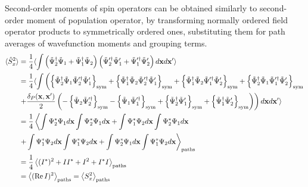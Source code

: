 Second-order moments of spin operators can be obtained similarly to second-order moment of population operator, by transforming normally ordered field operator products to symmetrically ordered ones, substituting them for path averages of wavefunction moments and grouping terms.
\begin{equation*}
\begin{split}
	\langle \hat{S}^2_x \rangle
	& = \frac{1}{4} \langle \int \left(
		\tilde{\Psi}^\dagger_2 \tilde{\Psi}_1 + \tilde{\Psi}^\dagger_1 \tilde{\Psi}_2
	\right)
	\left(
		\tilde{\Psi}^{\prime\dagger}_2 \tilde{\Psi}^\prime_1 + \tilde{\Psi}^{\prime\dagger}_1 \tilde{\Psi}^\prime_2
	\right) d\mathbf{x} d\mathbf{x}^\prime \rangle \\
	& = \frac{1}{4} \langle \int \left(
		\left\{  \tilde{\Psi}^\dagger_2 \tilde{\Psi}_1 \tilde{\Psi}^{\prime\dagger}_2 \tilde{\Psi}^\prime_1  \right\}_{\mathrm{sym}}
		+ \left\{  \tilde{\Psi}^\dagger_1 \tilde{\Psi}_2 \tilde{\Psi}^{\prime\dagger}_2 \tilde{\Psi}^\prime_1  \right\}_{\mathrm{sym}}
		+ \left\{  \tilde{\Psi}^\dagger_1 \tilde{\Psi}_2 \tilde{\Psi}^{\prime\dagger}_1 \tilde{\Psi}^\prime_2  \right\}_{\mathrm{sym}}
		+ \left\{  \tilde{\Psi}^\dagger_2 \tilde{\Psi}_1 \tilde{\Psi}^{\prime\dagger}_1 \tilde{\Psi}^\prime_2  \right\}_{\mathrm{sym}}
	\right. \\
	& \left.
		+ \frac{\delta_P(\mathbf{x},\mathbf{x}^\prime)}{2} \left(
			- \left\{  \tilde{\Psi}_2 \tilde{\Psi}^{\prime\dagger}_2  \right\}_{\mathrm{sym}}
			- \left\{  \tilde{\Psi}_1 \tilde{\Psi}^{\prime\dagger}_1  \right\}_{\mathrm{sym}}
			+ \left\{  \tilde{\Psi}^\dagger_2 \tilde{\Psi}^\prime_1  \right\}_{\mathrm{sym}}
			+ \left\{  \tilde{\Psi}^\dagger_1 \tilde{\Psi}^\prime_2  \right\}_{\mathrm{sym}}
		\right)
	\right) d\mathbf{x} d\mathbf{x}^\prime \rangle \\
	& = \frac{1}{4} \left\langle
		\int \Psi^*_2 \Psi_1 d\mathbf{x} \int \Psi^*_2 \Psi_1 d\mathbf{x}
		+ \int \Psi^*_1 \Psi_2 d\mathbf{x} \int \Psi^*_2 \Psi_1 d\mathbf{x} \right. \\
	&	\left. + \int \Psi^*_1 \Psi_2 d\mathbf{x} \int \Psi^*_1 \Psi_2 d\mathbf{x}
		+ \int \Psi^*_2 \Psi_1 d\mathbf{x} \int \Psi^*_1 \Psi_2 d\mathbf{x} \right\rangle_{\mathrm{paths}} \\
	& = \frac{1}{4} \left\langle  (I^*)^2 + I I^* + I^2 + I^* I  \right\rangle_{\mathrm{paths}} \\
	& = \left\langle  (\operatorname{Re} I)^2  \right\rangle_{\mathrm{paths}} = \left\langle  S^2_x  \right\rangle_{\mathrm{paths}}
\end{split}
\end{equation*}

